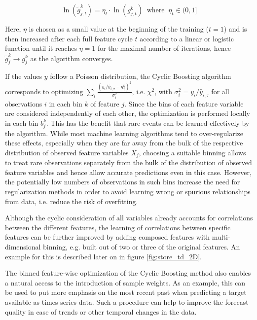 \documentclass[BCOR=1mm, DIV=calc,10pt,
twoside=true,
twocolumn,
headings=normal]{scrartcl}
\begin{document}
\begin{equation}
\ln(\tilde g^k_{j,t}) = \eta_t \cdot \ln(g^k_{j,t}) \;\; \mathrm{where} \; \; \eta_t \in (0,1]
\end{equation}

\noindent
Here, $\eta$ is chosen as a small value at the beginning of the training ($t=1$) and is
then increased after each full feature cycle $t$ according to a linear or logistic
function until it reaches $\eta = 1$ for the maximal number of iterations, hence
$\tilde g^k_j \to g^k_j$ as the algorithm converges.

If the values $y$ follow a Poisson distribution, the Cyclic Boosting algorithm corresponds
to optimizing $\sum_i \frac{(y_i/\hat{y}_{i,\tau} - g^k_j)^2}{\sigma_i^2}$, i.e. $\chi^2$,
with $\sigma_i^2 = y_i/\hat{y}_{i,\tau}$ for all observations $i$ in each bin $k$ of
feature $j$. Since the bins of each feature variable are considered independently of each
other, the optimization is performed locally in each bin $b^k_j$. This has the benefit
that rare events can be learned effectively by the algorithm. While most machine learning
algorithms tend to over-regularize these effects, especially when they are far away from
the bulk of the respective distribution of observed feature variables $X_j$, choosing a
suitable binning allows to treat rare observations separately from the bulk of the
distribution of observed feature variables and hence allow accurate predictions even in
this case. However, the potentially low numbers of observations in such bins increase the
need for regularization methods in order to avoid learning wrong or spurious relationships
from data, i.e. reduce the risk of overfitting.

Although the cyclic consideration of all variables already accounts for correlations
between the different features, the learning of correlations between specific features can
be further improved by adding composed features with multi-dimensional binning, e.g.
built out of two or three of the original features. An example for this is described later
on in figure \ref{fig:store_td_2D}.

The binned feature-wise optimization of the Cyclic Boosting method also enables a natural
access to the introduction of sample weights. As an example, this can be used to put more
emphasis on the most recent past when predicting a target available as times series data.
Such a procedure can help to improve the forecast quality in case of trends or other
temporal changes in the data.
\end{document}
